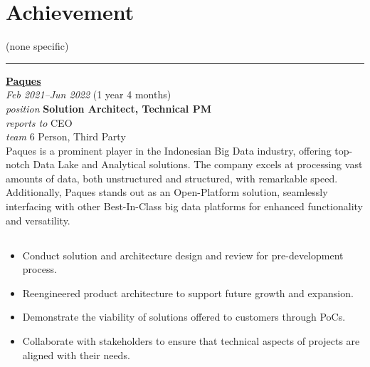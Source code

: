 \documentclass[12pt]{res}
\begin{document}
\begin{resume}
\begin{minipage}[t]{0.42\linewidth}
	\section{Achievement}
	\begin{flushleft}
        \footnotesize{\vspace{2.6pt}
(none specific)}
	\end{flushleft}
\end{minipage}

\vspace{10pt}
\rule{1.0\textwidth}{0.1pt}

\begin{multicols}{2}
	{\large {\bf \href{https://paques.id}{Paques}}} \\
	{\footnotesize{\sl Feb 2021--Jun 2022} \hfill (1 year 4 months)}\\
	{\footnotesize{\sl position} \hfill \bf{Solution Architect, Technical PM}}\\
	{\footnotesize{\sl reports to} \hfill CEO}\\
	{\footnotesize{\sl team} \hfill 6 Person, Third Party}\\

	\columnbreak
	{\footnotesize{Paques is a prominent player in the Indonesian Big Data industry, offering top-notch Data Lake and Analytical solutions. The company excels at processing vast amounts of data, both unstructured and structured, with remarkable speed. Additionally, Paques stands out as an Open-Platform solution, seamlessly interfacing with other Best-In-Class big data platforms for enhanced functionality and versatility.}}\\
\end{multicols}
\vspace{-20pt}

\begin{multicols}{2}
	\section{}
		\begin{itemize}
			\item Conduct solution and architecture design and review for pre-development process.
\item Reengineered product architecture to support future growth and expansion.
\item Demonstrate the viability of solutions offered to customers through PoCs.
\item Collaborate with stakeholders to ensure that technical aspects of projects are aligned with their needs.
		\end{itemize}

\end{multicols}
\end{resume}
\end{document}
